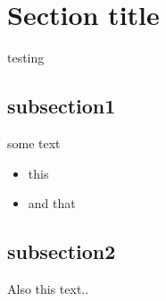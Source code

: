 \section{Section title}

testing \approx
\subsection{subsection1}
some text
\begin{itemize}
\item this
\item and that
\end{itemize}
\subsection{subsection2}
Also this text..

